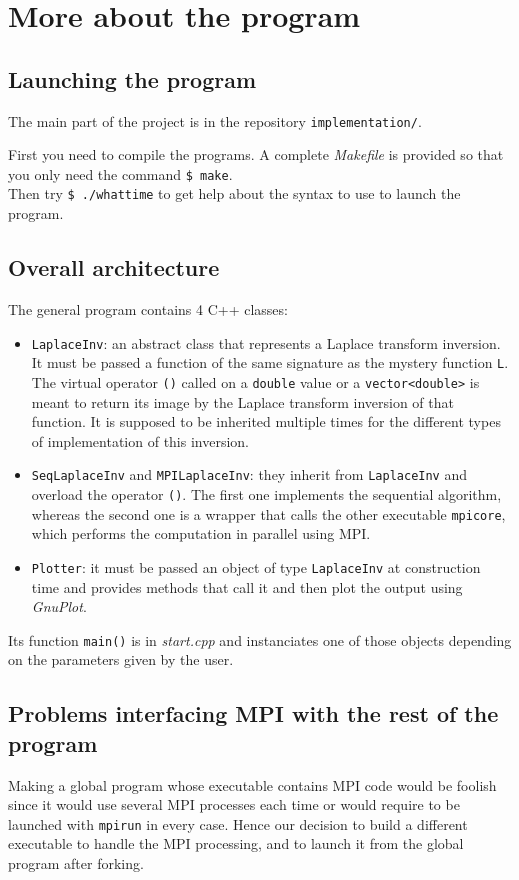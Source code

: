 \documentclass[11pt,a4paper]{article}
\begin{document}
\section{More about the program}

\subsection{Launching the program}

The main part of the project is in the repository \verb_implementation/_.

First you need to compile the programs. A complete \textit{Makefile} is provided so that you only need the command \verb_$ make_.\\

Then try \verb_$ ./whattime_ to get help about the syntax to use to launch the program.

\subsection{Overall architecture}

The general program contains 4 C++ classes:
\begin{itemize}
  \item \verb_LaplaceInv_: an abstract class that represents a Laplace transform inversion. It must be passed a function of the same signature as the mystery function \verb_L_. The virtual operator \verb_()_ called on a \verb_double_ value or a \verb_vector<double>_ is meant to return its image by the Laplace transform inversion of that function. It is supposed to be inherited multiple times for the different types of implementation of this inversion.
  \item \verb_SeqLaplaceInv_ and \verb_MPILaplaceInv_: they inherit from \verb_LaplaceInv_ and overload the operator \verb_()_. The first one implements the sequential algorithm, whereas the second one is a wrapper that calls the other executable \verb_mpicore_, which performs the computation in parallel using MPI.
  \item \verb_Plotter_: it must be passed an object of type \verb_LaplaceInv_ at construction time and provides methods that call it and then plot the output using \textit{GnuPlot}.
\end{itemize}
Its function \verb_main()_ is in \textit{start.cpp} and instanciates one of those objects depending on the parameters given by the user.

\subsection{Problems interfacing MPI with the rest of the program}
Making a global program whose executable contains MPI code would be foolish since it would use several MPI processes each time or would require to be launched with \verb_mpirun_ in every case. Hence our decision to build a different executable to handle the MPI processing, and to launch it from the global program after forking.\\
\end{document}
